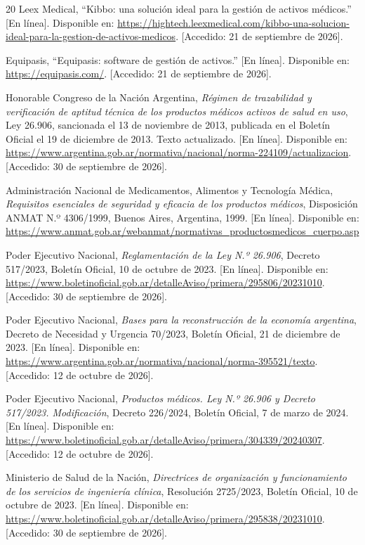 \documentclass[10pt]{article}
\begin{document}
\begin{thebibliography}{20}
Leex Medical, “Kibbo: una solución ideal para la gestión de activos médicos.” [En línea]. Disponible en: \url{https://hightech.leexmedical.com/kibbo-una-solucion-ideal-para-la-gestion-de-activos-medicos}. [Accedido: 21 de septiembre de 2026].

Equipasis, “Equipasis: software de gestión de activos.” [En línea]. Disponible en: \url{https://equipasis.com/}. [Accedido: 21 de septiembre de 2026].

Honorable Congreso de la Nación Argentina, \emph{Régimen de trazabilidad y verificación de aptitud técnica de los productos médicos activos de salud en uso}, Ley 26.906, sancionada el 13 de noviembre de 2013, publicada en el Boletín Oficial el 19 de diciembre de 2013. Texto actualizado. [En línea]. Disponible en: \url{https://www.argentina.gob.ar/normativa/nacional/norma-224109/actualizacion}. [Accedido: 30 de septiembre de 2026].

Administración Nacional de Medicamentos, Alimentos y Tecnología Médica, \emph{Requisitos esenciales de seguridad y eficacia de los productos médicos}, Disposición ANMAT N.º 4306/1999, Buenos Aires, Argentina, 1999. [En línea]. Disponible en: \url{https://www.anmat.gob.ar/webanmat/normativas_productosmedicos_cuerpo.asp}

Poder Ejecutivo Nacional, \emph{Reglamentación de la Ley N.º 26.906}, Decreto 517/2023, Boletín Oficial, 10 de octubre de 2023. [En línea]. Disponible en: \url{https://www.boletinoficial.gob.ar/detalleAviso/primera/295806/20231010}. [Accedido: 30 de septiembre de 2026].

Poder Ejecutivo Nacional, \emph{Bases para la reconstrucción de la economía argentina}, Decreto de Necesidad y Urgencia 70/2023, Boletín Oficial, 21 de diciembre de 2023. [En línea]. Disponible en: \url{https://www.argentina.gob.ar/normativa/nacional/norma-395521/texto}. [Accedido: 12 de octubre de 2026].

Poder Ejecutivo Nacional, \emph{Productos médicos. Ley N.º 26.906 y Decreto 517/2023. Modificación}, Decreto 226/2024, Boletín Oficial, 7 de marzo de 2024. [En línea]. Disponible en: \url{https://www.boletinoficial.gob.ar/detalleAviso/primera/304339/20240307}. [Accedido: 12 de octubre de 2026].

Ministerio de Salud de la Nación, \emph{Directrices de organización y funcionamiento de los servicios de ingeniería clínica}, Resolución 2725/2023, Boletín Oficial, 10 de octubre de 2023. [En línea]. Disponible en: \url{https://www.boletinoficial.gob.ar/detalleAviso/primera/295838/20231010}. [Accedido: 30 de septiembre de 2026].


\end{thebibliography}
\end{document}
